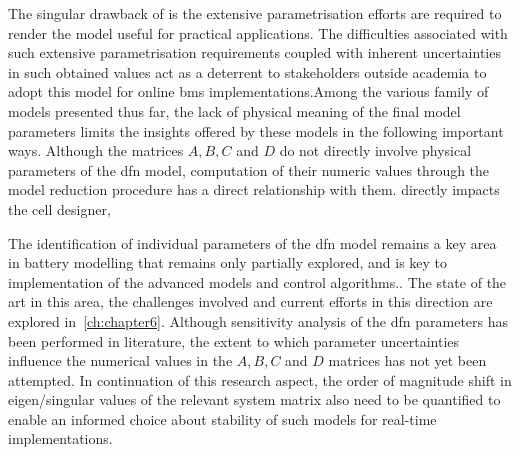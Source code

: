 The  singular   drawback  of     is   the  extensive
parametrisation efforts are required  to  render the model useful  for practical
applications. The  difficulties associated  with such  extensive parametrisation
requirements coupled with inherent uncertainties  in such obtained values act as
a deterrent  to stakeholders  outside academia  to adopt  this model  for online
\gls{bms} implementations.Among the various family of models presented thus far,
the lack of  physical meaning of the final model  parameters limits the insights
offered by these  models in the following important ways.  Although the matrices
$A, B, C$ and  $D$ do not directly involve physical  parameters of the \gls{dfn}
model, computation of their numeric values through the model reduction procedure
has a direct relationship with them. directly impacts the cell designer,

  The
identification of  individual parameters  of the \gls{dfn}  model remains  a key
area in  battery modelling that remains  only partially explored, and  is key to
implementation of the advanced models and control algorithms.. The  state  of the  art  in this  area,
the  challenges involved  and current  efforts  in this  direction are  explored
in~\cref{ch:chapter6}. Although sensitivity analysis of the \gls{dfn} parameters
has  been performed  in literature,   the  extent to  which
parameter uncertainties influence the numerical values  in the $A, B, C$ and $D$
matrices has  not yet been attempted.  In continuation of this  research aspect,
the order  of magnitude shift  in eigen/singular  values of the  relevant system
matrix also need  to be quantified to enable an  informed choice about stability
of such models for real-time implementations.










